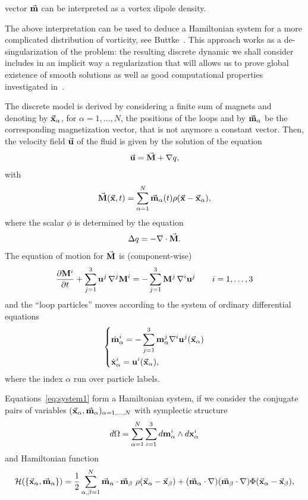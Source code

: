 \documentclass[a4paper,11pt]{article}
\numberwithin{equation}{section}
\newcommand{\U}{\mbox{$\vec{\bf u}$}}
\newcommand{\UU}{\mbox{${\bf u}$}}
\newcommand{\x}{\mbox{$\vec{\bf x}$}}
\newcommand{\m}{\mbox{$\vec{\bf m}$}}
\begin{document}
vector $\m$ can be  interpreted as a vortex dipole density.\par  
%  
The above interpretation can be used to deduce a Hamiltonian system
for a more complicated distribution of vorticity, see
Buttke~\cite{MR1248421}. This approach works as a de-singularization
of the problem: the resulting discrete dynamic we shall consider
includes in an implicit way a regularization that will allows us to
prove global existence of smooth solutions as well as good
computational properties investigated in~\cite{MR1248421}.\par
%   
The discrete model is derived by considering a finite sum of magnets
and denoting by $\x_\alpha$, for $\alpha=1,\dots,N$, the positions of
the loops and by $\m_\alpha$ be the corresponding magnetization 
vector, that is not anymore a constant vector. Then, the velocity
field $\U$ of the fluid is given by the solution of the  
equation
\begin{equation*}
\U=\vec{\bf M}+\nabla q,
\end{equation*}
with
$$
\vec{\bf M}(\x,t)=\sum_{\alpha=1}^N \m_\alpha(t)\rho(\x-\x_\alpha),  
$$ 
where the scalar $\phi$ is determined by the equation
$$
\Delta q=-\nabla\cdot\vec{\bf M}.
$$
The equation of motion for $\vec{\bf M}$ is (component-wise)
\begin{equation*}
  \frac{\partial{\bf M}^i}{\partial t}+\sum_{j=1}^3\UU^j\,\nabla^j
  {\bf M}^i =-\sum_{j=1}^3{\bf M}^j\,\nabla^i \UU^j\qquad
  i=1,\dots,3
\end{equation*}
 and the ``loop particles'' moves according to the system of ordinary
differential equations
\begin{equation}
\label{eq:system1}
\left\{\begin{aligned}
&\dot {\bf m}_\alpha^i = - \sum_{j=1}^3{\bf m}_\alpha^j \nabla^i
  \UU^j(\x_\alpha)\\ 
&\dot {\bf x}_\alpha^i = \UU^i(\x_\alpha),
       \end{aligned}
\right.
\end{equation}
where the index $\alpha$ run over particle labels.\par
%
Equations~\eqref{eq:system1} form a Hamiltonian system, if we consider
the conjugate pairs of variables
$(\x_\alpha,\m_\alpha)_{\alpha=1,\dots,N}$ with symplectic structure 
$$
d\Omega = \sum_{\alpha=1}^N\sum_{i=1}^3 d{\bf m}_\alpha^i \wedge d{\bf
  x}_\alpha^i 
$$ 
and Hamiltonian function
\begin{equation*}%
\mathcal{H}(\{\x_\alpha,\m_\alpha\})=\frac{1}{2} 
\sum_{\alpha,\beta=1}^N \m_\alpha \cdot \m_\beta\
\rho(\x_\alpha-\x_\beta) + (\m_\alpha \cdot \nabla) (\m_\beta\cdot
\nabla) \Phi(\x_\alpha-\x_\beta),   
\end{equation*}
\end{document}
